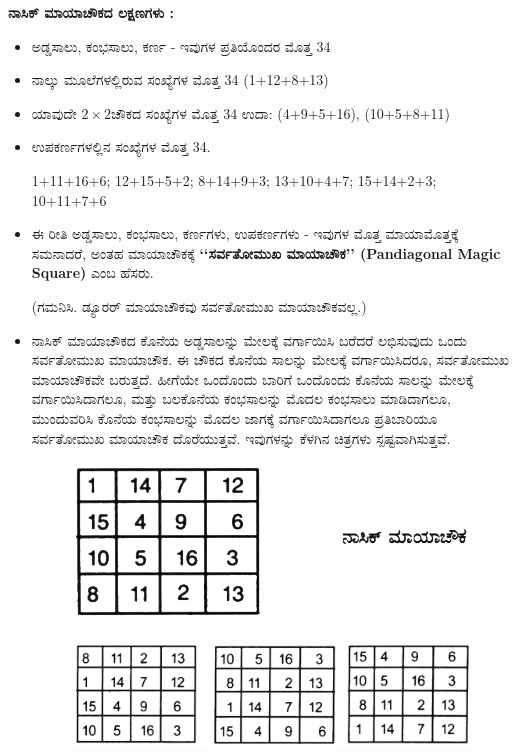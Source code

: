 \textbf{ನಾಸಿಕ್ ಮಾಯಾಚೌಕದ ಲಕ್ಷಣಗಳು :}

\begin{itemize}
	\item ಅಡ್ಡಸಾಲು, ಕಂಭಸಾಲು, ಕರ್ಣ - ಇವುಗಳ ಪ್ರತಿಯೊಂದರ ಮೊತ್ತ 34
	\item ನಾಲ್ಕು ಮೂಲೆಗಳಲ್ಲಿರುವ ಸಂಖ್ಯೆಗಳ ಮೊತ್ತ 34 (1+12+8+13)
	\item ಯಾವುದೇ $2 \times 2$ಚೌಕದ ಸಂಖ್ಯೆಗಳ ಮೊತ್ತ 34 ಉದಾ: (4+9+5+16), (10+5+8+11)
	\item ಉಪಕರ್ಣಗಳಲ್ಲಿನ ಸಂಖ್ಯೆಗಳ ಮೊತ್ತ 34.

	1+11+16+6; 12+15+5+2; 8+14+9+3; 13+10+4+7; 15+14+2+3; 10+11+7+6
	\item ಈ ರೀತಿ ಅಡ್ಡಸಾಲು, ಕಂಭಸಾಲು, ಕರ್ಣಗಳು, ಉಪಕರ್ಣಗಳು - ಇವುಗಳ ಮೊತ್ತ ಮಾಯಾಮೊತ್ತಕ್ಕೆ ಸಮನಾದರೆ, ಅಂತಹ ಮಾಯಾಚೌಕಕ್ಕೆ  \textbf{‘‘ಸರ್ವತೋಮುಖ ಮಾಯಾಚೌಕ’’ (Pandiagonal Magic Square)} ಎಂಬ ಹೆಸರು.

	(ಗಮನಿಸಿ. ಡ್ಯೂರರ್ ಮಾಯಾಚೌಕವು ಸರ್ವತೋಮುಖ ಮಾಯಾಚೌಕವಲ್ಲ.)
	\item ನಾಸಿಕ್ ಮಾಯಾಚೌಕದ ಕೊನೆಯ ಅಡ್ಡಸಾಲನ್ನು ಮೇಲಕ್ಕೆ ವರ್ಗಾಯಿಸಿ ಬರೆದರೆ ಲಭಿಸುವುದು ಒಂದು ಸರ್ವತೋಮುಖ ಮಾಯಾಚೌಕ. ಈ ಚೌಕದ ಕೊನೆಯ ಸಾಲನ್ನು ಮೇಲಕ್ಕೆ ವರ್ಗಾಯಿಸಿದರೂ, ಸರ್ವತೋಮುಖ ಮಾಯಾಚೌಕವೇ ಬರುತ್ತದೆ. ಹೀಗೆಯೇ ಒಂದೊಂದು ಬಾರಿಗೆ ಒಂದೊಂದು ಕೊನೆಯ ಸಾಲನ್ನು ಮೇಲಕ್ಕೆ ವರ್ಗಾಯಿಸಿದಾಗಲೂ, ಮತ್ತು ಬಲಕೊನೆಯ ಕಂಭಸಾಲನ್ನು ಮೊದಲ ಕಂಭಸಾಲು ಮಾಡಿದಾಗಲೂ, ಮುಂದುವರಿಸಿ ಕೊನೆಯ ಕಂಭಸಾಲನ್ನು ಮೊದಲ ಜಾಗಕ್ಕೆ ವರ್ಗಾಯಿಸಿದಾಗಲೂ ಪ್ರತಿಬಾರಿಯೂ ಸರ್ವತೋಮುಖ ಮಾಯಾಚೌಕ ದೊರೆಯುತ್ತವೆ. ಇವುಗಳನ್ನು ಕೆಳಗಿನ ಚಿತ್ರಗಳು ಸ್ಪಷ್ಟವಾಗಿಸುತ್ತವೆ.
	\begin{figure}[H]
	\includegraphics[scale=.8]{src/figures/chap4/fig4-3.jpg}
	\end{figure}
	\begin{figure}[H]
	\includegraphics[scale=.8]{src/figures/chap4/fig4-4.jpg}
	\end{figure}


\end{itemize}
